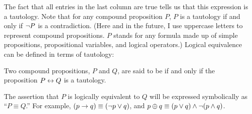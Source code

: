 The fact that all entries in the last column are true tells us that
this expression is a tautology.  Note that for any compound proposition
$P$, $P$ is a tautology if and only if $\lnot P$ is a contradiction.
(Here and in the future, I use uppercase letters to represent
compound propositions.  $P$ stands for any formula made up of
simple propositions, propositional variables, and logical operators.)
Logical equivalence can be defined in terms of tautology:

\begin{definition}\label{D-logeq}
Two compound propositions, $P$ and $Q$, are said to be  if and only if the proposition $P\leftrightarrow Q$ is a tautology.
\end{definition}

The assertion that $P$ is logically equivalent to $Q$ will
be expressed symbolically as ``$P\equiv Q$.''  For example, $(p\rightarrow q)\equiv(\lnot p \vee q)$,
and $p\oplus q\equiv (p\vee q)\wedge \lnot(p\wedge q)$.


